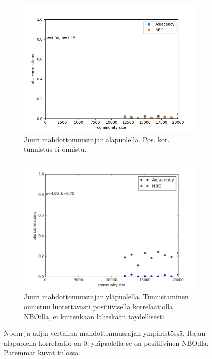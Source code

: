 \documentclass[finnish,12pt,a4paper,pdftex,sci,utf8]{aaltothesis}
\begin{document}
\begin{figure}
	\centering
	\begin{subfigure}[b]{0.45 \textwidth}
		\includegraphics[width = \textwidth]{impossible.png}
		\caption{Juuri mahdottomuusrajan alapuolella. Pos. kor. tunnistus ei onnistu.}
	\end{subfigure}
	\begin{subfigure}[b]{0.45 \textwidth}
		\includegraphics[width = \textwidth]{possible.png}
		\caption{Juuri mahdottomuusrajan yläpuolella. Tunnistaminen onnistuu luotettavasti positiivisella korrelaatiolla NBO:lla, ei kuitenkaan läheskään täydellisesti.}
	\end{subfigure}
	\caption{Nbo:n ja adj:n vertailua mahdottomuusrajan ympäristössä. Rajan alapuolella korrelaatio on 0, yläpuolella se on positiivinen NBO:lla. Paremmat kuvat tulossa.}
	\label{fig:rajatapaus}
\end{figure}
\end{document}
